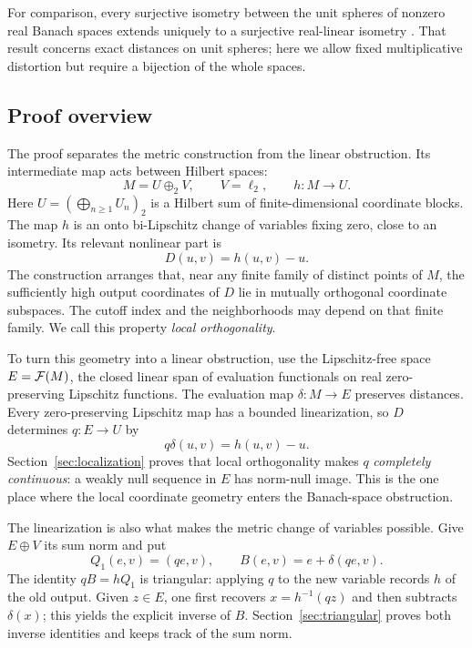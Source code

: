 For comparison, every surjective isometry between the unit spheres of
nonzero real Banach spaces extends uniquely to a surjective real-linear
isometry \cite[Theorem~1.1]{OpenAITingley}.
That result concerns exact distances on unit spheres; here we allow
fixed multiplicative distortion but require a bijection of the whole
spaces.

\subsection*{Proof overview}

The proof separates the metric construction from the linear
obstruction. Its intermediate map acts between Hilbert spaces:
\[
 M=U\oplus_2 V,\qquad V=\ell_2,\qquad
 h:M\longrightarrow U.
\]
Here \(U=(\bigoplus_{n\ge1}U_n)_2\) is a Hilbert sum of
finite-dimensional coordinate blocks. The map \(h\) is an onto
bi-Lipschitz change of variables fixing zero, close to an isometry. Its relevant
nonlinear part is
\[
 D(u,v)=h(u,v)-u.
\]
The construction arranges that, near any finite family of distinct
points of \(M\), the sufficiently high output coordinates of \(D\)
lie in mutually orthogonal coordinate subspaces. The cutoff index and
the neighborhoods may depend on that finite family. We call this
property \emph{local orthogonality}.

To turn this geometry into a linear obstruction, use the
Lipschitz-free space \(E=\mathcal F(M)\), the closed linear span of evaluation
functionals on real zero-preserving Lipschitz functions.
The evaluation map \(\delta:M\to E\) preserves distances. Every
zero-preserving Lipschitz map has a bounded linearization, so \(D\)
determines \(q:E\to U\) by
\[
 q\delta(u,v)=h(u,v)-u.
\]
Section~\ref{sec:localization} proves that local orthogonality makes
\(q\) \emph{completely continuous}: a weakly null sequence in \(E\)
has norm-null image. This is the one place where the local coordinate
geometry enters the Banach-space obstruction.

The linearization is also what makes the metric change of variables
possible. Give \(E\oplus V\) its sum norm and put
\[
 Q_1(e,v)=(qe,v),\qquad
 B(e,v)=e+\delta(qe,v).
\]
The identity \(qB=hQ_1\) is triangular: applying \(q\) to the new
variable records \(h\) of the old output. Given \(z\in E\), one first
recovers \(x=h^{-1}(qz)\) and then subtracts \(\delta(x)\); this yields
the explicit inverse of \(B\). Section~\ref{sec:triangular} proves
both inverse identities and keeps track of the sum norm.

